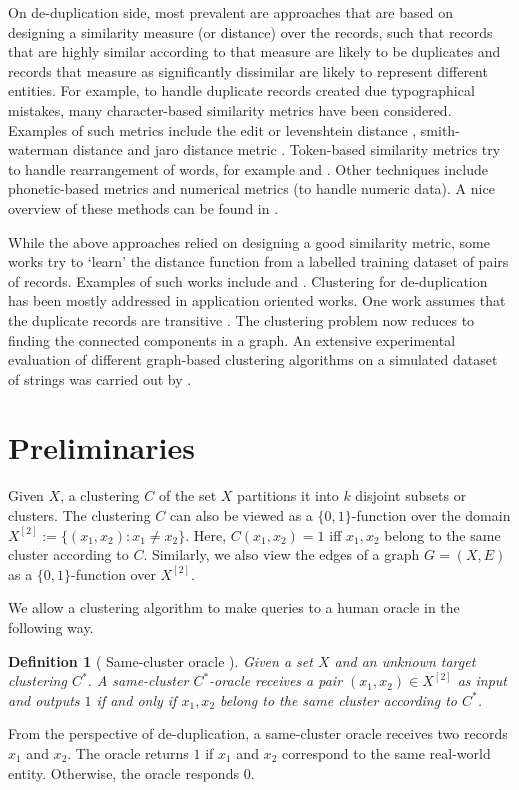 \documentclass[12pt]{article}
\newtheorem{definition}[theorem]{Definition}
\begin{document}
On de-duplication side, most prevalent are approaches that are based on designing a similarity measure (or distance) over the records, such that records that are highly similar according to that measure are likely to be duplicates and records that measure as significantly dissimilar are likely to represent different entities. For example, to handle duplicate records created due typographical mistakes, many character-based similarity metrics have been considered. Examples of such metrics include the edit or levenshtein distance \cite{levenshtein1966binary}, smith-waterman distance \cite{waterman1981identification} and jaro distance metric \cite{jaro1980unimatch}. Token-based similarity metrics try to handle rearrangement of words, for example \cite{monge1996field} and \cite{cohen1998integration}. Other techniques include phonetic-based metrics and numerical metrics (to handle numeric data). A nice overview of these methods can be found in \cite{elmagarmid2007duplicate}. 
   
While the above approaches relied on designing a good similarity metric, some works try to `learn' the distance function from a labelled training dataset of pairs of records. Examples of such works include \cite{cochinwala2001efficient} and \cite{bilenko2003adaptive}. Clustering for de-duplication has been mostly addressed in application oriented works. One work assumes that the duplicate records are transitive \cite{hernandez1995merge}. The clustering problem now reduces to finding the connected components in a graph. An extensive experimental evaluation of different graph-based clustering algorithms on a simulated dataset of strings was carried out by \cite{hassanzadeh2009framework}.

\section{Preliminaries}
\label{section:problemFormulation}
Given $X$, a clustering $C$ of the set $X$ partitions it into $k$ disjoint subsets or clusters. The clustering $C$ can also be viewed as a $\{0, 1\}$-function over the domain $X^{[2]} := \{(x_1, x_2) : x_1 \neq x_2\}$. Here, $C(x_1, x_2) = 1$ iff $x_1, x_2$ belong to the same cluster according to $C$. Similarly, we also view the edges of a graph $G = (X, E)$ as a $\{0, 1\}$-function over $X^{[2]}$.

We allow a clustering algorithm to make queries to a human oracle in the following way. 
\begin{definition}[ Same-cluster oracle \cite{ashtiani2016clustering}]
Given a set $X$ and an unknown target clustering $C^*$. A same-cluster $C^*$-oracle receives a pair $(x_1, x_2) \in X^{[2]}$ as input and outputs $1$ if and only if $x_1, x_2$ belong to the same cluster according to $C^*$. 
\end{definition}
From the perspective of de-duplication, a same-cluster oracle receives two records $x_1$ and $x_2$. The oracle returns $1$ if $x_1$ and $x_2$ correspond to the same real-world entity. Otherwise, the oracle responds $0$.
\end{document}
